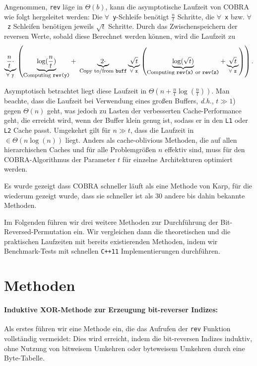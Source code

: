 \documentclass[10pt]{article}
\begin{document}
Angenommen, {\tt rev} läge in $\Theta(b)$, kann die asymptotische Laufzeit von COBRA wie folgt 
hergeleitet werden: Die $\forall$~{\tt y}-Schleife benötigt $\frac{n}{t}$ Schritte, die 
$\forall$~{\tt x} bzw. $\forall$~{\tt z} Schleifen benötigen jeweils $\sqrt{t}$ Schritte. 
Durch das Zwischenspeichern der reversen Werte, sobald diese Berechnet werden können, wird die 
Laufzeit zu 
\[
\underbrace{\frac{n}{t} \cdot }_{\forall~{\tt y}} \left( \underbrace{ \log(\frac{n}{t}) }_{\mbox{\footnotesize Computing {\tt rev(y)}}} +~ \underbrace{2 \cdot}_{\mbox{\footnotesize Copy to/from {\tt buff}}} \underbrace{\sqrt{t}}_{\forall~{\tt x}} \left(
\underbrace{\log(\sqrt{t})}_{\mbox{\footnotesize Computing {\tt rev(x)} or {\tt rev(z)}}} + \underbrace{\sqrt{t}}_{\forall~{\tt z}} \right) \right).
\]

Asymptotisch betrachtet liegt diese Laufzeit in $\Theta\left( n + \frac{n}{t} \log(\frac{n}{t}) \right)$. 
Man beachte, dass die Laufzeit bei Verwendung eines großen Buffers, \emph{d.h.}, $t \gg 1$)
gegen  $\Theta\left( n \right)$ geht, was jedoch zu Lasten der verbesserten Cache-Performance geht, die erreicht wird, 
wenn der Buffer klein genug ist, sodass er in den {\tt L1} oder {\tt L2} Cache passt.
Umgekehrt gilt für $n \gg t$, dass die Laufzeit in $\in \Theta(n \log(n))$ liegt. 
Anders als cache-oblivious Methoden, die auf allen hierarchischen Caches und für alle Problemgrößen
$n$ effektiv sind, muss für den COBRA-Algorithmus der Parameter $t$ für einzelne Architekturen
optimiert werden.

Es wurde gezeigt dass COBRA schneller läuft als eine Methode von Karp\cite{carter:towards}, für die wiederum 
gezeigt wurde, dass sie schneller ist als 30 andere bis dahin bekannte Methoden\cite{karp:bit}.\newline

Im Folgenden führen wir drei weitere Methoden zur Durchführung der Bit-Reversed-Permutation ein. 
Wir vergleichen dann die theoretischen und die praktischen Laufzeiten mit bereits existierenden Methoden, indem wir 
Benchmark-Tests mit schnellen {\tt C++11} Implementierungen durchführen. 

\section*{Methoden}

\paragraph{Induktive XOR-Methode zur Erzeugung bit-reverser Indizes:}
Als erstes führen wir eine Methode ein, die das Aufrufen der {\tt rev} Funktion
vollständig vermeidet: Dies wird erreicht, indem die bit-reversen Indizes induktiv, ohne Nutzung von 
bitweisem Umkehren oder byteweisem Umkehren durch eine Byte-Tabelle. 
\end{document}
